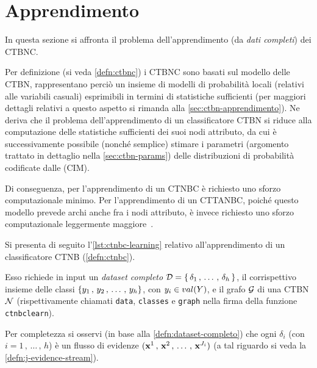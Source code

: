 \section{Apprendimento}\label{sec:learning-ctbnc}
In questa sezione si affronta il problema dell'apprendimento (da \emph{dati completi}) dei \acs{CTBNC}.

Per definizione (si veda \ref{defn:ctbnc}) i \acs{CTBNC} sono basati sul modello delle \acs{CTBN}, rappresentano perciò un insieme di modelli di probabilità locali (relativi alle variabili casuali) esprimibili in termini di statistiche sufficienti (per maggiori dettagli relativi a questo aspetto si rimanda alla \autoref{sec:ctbn-apprendimento}). Ne deriva che il problema dell'apprendimento di un classificatore \acs{CTBN} si riduce alla computazione delle statistiche sufficienti dei suoi nodi attributo, da cui è successivamente possibile (nonché semplice) stimare i parametri (argomento trattato in dettaglio nella \autoref{sec:ctbn-params}) delle distribuzioni di probabilità codificate dalle \cim{} (\acs{CIM}).

Di conseguenza, per l'apprendimento di un \acs{CTNBC} è richiesto uno sforzo computazionale minimo. Per l'apprendimento di un \acs{CTTANBC}, poiché questo modello prevede archi anche fra i nodi attributo, è invece richiesto uno sforzo computazionale leggermente maggiore~\citep{Stella2012}.

Si presenta di seguito l'\autoref{lst:ctnbc-learning} relativo all'apprendimento di un classificatore \acs{CTNB} (\autoref{defn:ctnbc}).

Esso richiede in input un \emph{dataset completo} $\mathcal{D}=\{\,\delta_1\,,\,\dotsc\,,\,\delta_h\,\}$, il corrispettivo insieme delle classi $\{\mathnormal{y}_1\,,\,\mathnormal{y}_2\,,\,\dotsc\,,\,\mathnormal{y}_h\}$, con $\mathnormal{y}_i \in val(\mathnormal{Y})$, e il grafo $\mathcal{G}$ di una \acs{CTBN} $\mathcal{N}$ (rispettivamente chiamati \lstinline[]|data|, \lstinline[]|classes| e \lstinline[]|graph| nella firma della funzione \lstinline[]|ctnbclearn|).

Per completezza si osservi (in base alla \autoref{defn:dataset-completo}) che ogni $\delta_i$ (con $i=1\,,\,\dotsc\,,\,h$) è un flusso di evidenze $(\mathbf{x}^1\,,\,\mathbf{x}^2\,,\,\dotsc\,,\,\mathbf{x}^{J_i})$ (a tal riguardo si veda la \autoref{defn:j-evidence-stream}).


